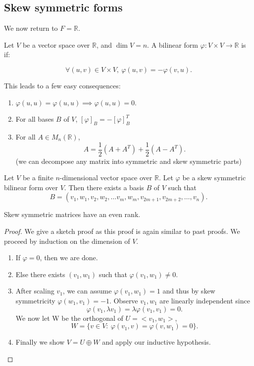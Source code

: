 \documentclass[a4paper]{scrartcl}
\begin{document}
\subsection{Skew symmetric forms}
We now return to $F=\mathbb{R}$.
\begin{definition}
      Let $V$ be a vector space over $\mathbb{R}$, and $\operatorname{dim}V=n$. A bilinear form $\varphi: V \times V \rightarrow \mathbb{R}$ is  if: 
      
      \[\forall \left(u,v\right) \in V \times V, \ \varphi \left(u,v\right)=-\varphi \left(v,u\right).\]
\end{definition}
\begin{remark} This leads to a few easy consequences:
      \begin{enumerate}
           \item $\varphi \left(u,u\right)=\varphi \left(u,u\right) \implies \varphi \left(u,u\right)=0$.
           \item For all bases $B$ of $V$, $[\varphi]_B=-[\varphi]_B^T$
           \item For all $A \in M_n \left(\mathbb{R}\right)$,
           \[A=\frac{1}{2}\left(A+A^T\right)+ \frac{1}{2}\left(A-A^T\right).\]
           (we can decompose any matrix into symmetric and skew symmetric parts)
      \end{enumerate}
\end{remark}
\begin{theorem}
      Let $V$ be a finite $n$-dimensional vector space over $\mathbb{R}$. Let $\varphi$ be a skew symmetric bilinear form over $V$. Then there exists a basis $B$ of $V$ such that 
      \[B=\left(v_1,w_1,v_2,w_2, \ldots v_m,w_m,v_{2m+1},v_{2m+2},\ldots ,v_n\right).\]
\end{theorem}
\begin{corollary}
     Skew symmetric matrices have an even rank.
\end{corollary}
\begin{proof}
      We give a sketch proof as this proof is again similar to past proofs. We proceed by induction on the dimension of $V$.
      \begin{enumerate}
           \item If $\varphi=0$, then we are done.
           \item Else there exists $\left(v_1,w_1\right)$ such that $\varphi \left(v_1,w_1\right)\neq 0$.
           \item After scaling $v_1$, we can assume $\varphi \left(v_1,w_1\right)=1$ and thus by skew symmetricity $\varphi \left(w_1,v_1\right)=-1$. Observe $v_1,w_1$ are linearly independent since 
           \[\varphi \left(v_1, \lambda v_1\right)=\lambda \varphi \left(v_1,v_1\right)=0.\]
           We now let W be the orthogonal of $U=<v_1,w_1>$, 
           \[ W=\{v \in V: \ \varphi \left(v_1,v\right)=\varphi \left(v,w_1\right)=0 \}. \]
           \item Finally we show $V=U \oplus W$ and apply our inductive hypothesis.
      \end{enumerate}
\end{proof}
\end{document}
